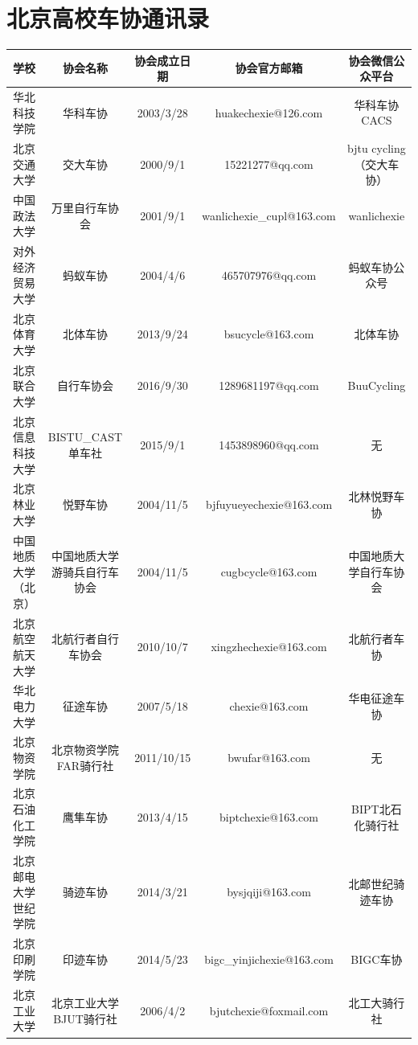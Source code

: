 \documentclass{ctexbook}
\begin{document}
\section{北京高校车协通讯录}
\label{ssec:北京高校车协通讯录}
\begin{table}[H]
    \centering
    \tiny
    \begin{tabular}{|c|c|c|c|c|}
    \hline
        学校 & 协会名称 & 协会成立日期 & 协会官方邮箱 & 协会微信公众平台 \\ \hline
        华北科技学院 & 华科车协 & 2003/3/28 & huakechexie@126.com & 华科车协CACS \\ \hline
        北京交通大学 & 交大车协 & 2000/9/1 & 15221277@qq.com & bjtu cycling（交大车协） \\ \hline
        中国政法大学 & 万里自行车协会 & 2001/9/1 & wanlichexie\_cupl@163.com & wanlichexie \\ \hline
        对外经济贸易大学 & 蚂蚁车协 & 2004/4/6 & 465707976@qq.com & 蚂蚁车协公众号 \\ \hline
        北京体育大学 & 北体车协 & 2013/9/24 & bsucycle@163.com & 北体车协 \\ \hline
        北京联合大学 & 自行车协会 & 2016/9/30 & 1289681197@qq.com & BuuCycling \\ \hline
        北京信息科技大学 & BISTU\_CAST单车社 & 2015/9/1 & 1453898960@qq.com & 无 \\ \hline
        北京林业大学 & 悦野车协 & 2004/11/5 & bjfuyueyechexie@163.com & 北林悦野车协 \\ \hline
        中国地质大学（北京） & 中国地质大学游骑兵自行车协会 & 2004/11/5 & cugbcycle@163.com & 中国地质大学自行车协会 \\ \hline
        北京航空航天大学 & 北航行者自行车协会 & 2010/10/7 & xingzhechexie@163.com & 北航行者车协 \\ \hline
        华北电力大学 & 征途车协 & 2007/5/18 & chexie@163.com & 华电征途车协 \\ \hline
        北京物资学院 & 北京物资学院FAR骑行社 & 2011/10/15 & bwufar@163.com & 无 \\ \hline
        北京石油化工学院 & 鹰隼车协 & 2013/4/15 & biptchexie@163.com & BIPT北石化骑行社 \\ \hline
        北京邮电大学世纪学院 & 骑迹车协 & 2014/3/21 & bysjqiji@163.com & 北邮世纪骑迹车协 \\ \hline
        北京印刷学院 & 印迹车协 & 2014/5/23 & bigc\_yinjichexie@163.com & BIGC车协 \\ \hline
        北京工业大学 & 北京工业大学BJUT骑行社 & 2006/4/2 & bjutchexie@foxmail.com & 北工大骑行社 \\ \hline

\end{tabular}
\end{table}
\end{document}
